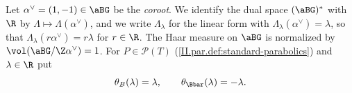 Let $\alpha^\vee=(1,-1)\in\aBG$ be the \emph{coroot}. We identify the dual space $(\aBG)^*$ with $\R$ by $\Lambda\mapsto\Lambda(\alpha^\vee)$, and
we write $\Lambda_\lambda$ for the linear form with $\Lambda_\lambda(\alpha^\vee)=\lambda$, so that $\Lambda_\lambda(r\alpha^\vee)=r\lambda$ for $r\in\R$. The Haar
measure on $\aBG$ is normalized by $\vol(\aBG/\Z\alpha^\vee)=1$. For $P\in\mathcal P(T)$ (\cref{II.par.def:standard-parabolics}) and $\lambda\in\R$ put
\[
  \theta_B(\lambda)=\lambda,\qquad\theta_{\Bbar}(\lambda)=-\lambda .
\]
